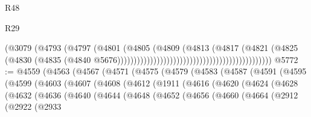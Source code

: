 \begin{lexlean}{R48}
\begin{lexlean}{R29}
\begin{coremodule}
{{{{{{{{{{{{{{{{{{{{{{{{{{{{{{{{{{{{{{{{{{{{{{{{{{{{{{{{{{{{{{{{{{{{{{{{{{{{{{{{{{{{{{{{{{{{{{{{{{{{{{{{{{{{{{{{{{{{{{{{{{{{{{{{{{{{{{{{{{{{{{{{{{{{{{{{{{{{{{{{{{{{{{{{{{{{{{{{{{{{{{{{{{{{{{{{{{{{{{{{{{{{{{{{{{{{{{{{{{                                                                        (@3079
                                                                          (@4793
                                                                            (@4797
                                                                              (@4801
                                                                                (@4805
                                                                                  (@4809
                                                                                    (@4813
                                                                                      (@4817
                                                                                        (@4821
                                                                                          (@4825
                                                                                            (@4830
                                                                                              (@4835
                                                                                                (@4840
                                                                                                  @5676)))))))))))))))))))))))))))))))))))))))))))))))
@5772 := @4559
    (@4563
      (@4567
        (@4571
          (@4575
            (@4579
              (@4583
                (@4587
                  (@4591
                    (@4595
                      (@4599
                        (@4603
                          (@4607
                            (@4608
                              (@4612
                                (@1911
                                  (@4616
                                    (@4620
                                      (@4624
                                        (@4628
                                          (@4632
                                            (@4636
                                              (@4640
                                                (@4644
                                                  (@4648
                                                    (@4652
                                                      (@4656
                                                        (@4660
                                                          (@4664
                                                            (@2912
                                                              (@2922
                                                                (@2933
}}}}}}}}}}}}}}}}}}}}}}}}}}}}}}}}}}}}}}}}}}}}}}}}}}}}}}}}}}}}}}}}}}}}}}}}}}}}}}}}}}}}}}}}}}}}}}}}}}}}}}}}}}}}}}}}}}}}}}}}}}}}}}}}}}}}}}}}}}}}}}}}}}}}}}}}}}}}}}}}}}}}}}}}}}}}}}}}}}}}}}}}}}}}}}}}}}}}}}}}}}}}}}}}}}}}}}}}}}
\end{coremodule}
\end{lexlean}
\end{lexlean}
